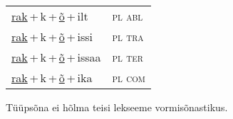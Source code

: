 \begin{minipage}{\textwidth}
\begin{sideways}
\begin{tabular}{l l}
\underline{rak}\,+\,k\,+\,\underline{õ}\,+\,ilt & \textsc{ pl abl } \\
\underline{rak}\,+\,k\,+\,\underline{õ}\,+\,issi & \textsc{ pl tra } \\
\underline{rak}\,+\,k\,+\,\underline{õ}\,+\,issaa & \textsc{ pl ter } \\
\underline{rak}\,+\,k\,+\,\underline{õ}\,+\,ika & \textsc{ pl com } \\
\end{tabular}
\end{sideways}
\label{tab:tüüpsõnamall-rakõ}

\end{minipage}

 
\vspace{1em}
\noindent Tüüpsõna ei hõlma teisi lekseeme vormi\-sõnastikus.
